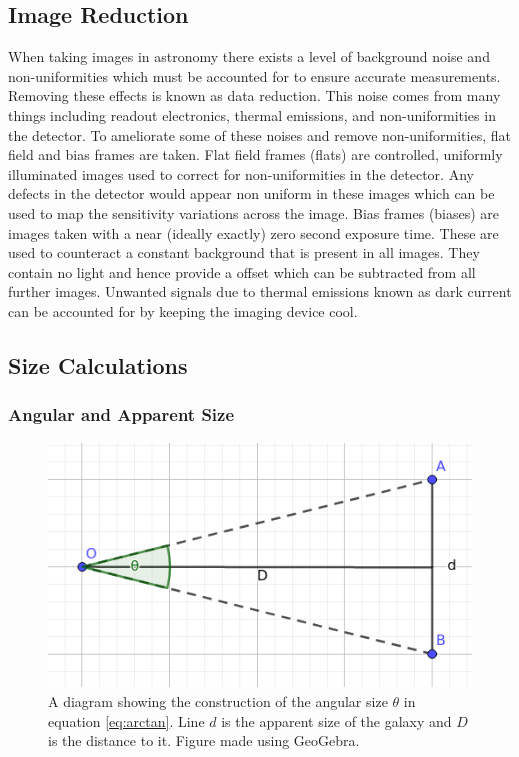 \documentclass[%
reprint,
amsmath,amssymb,
aps,
]{revtex4-2}
\begin{document}
		\subsection{Image Reduction}
			When taking images in astronomy there exists a level of background noise and non-uniformities which must be accounted for to ensure accurate measurements. Removing these effects is known as data reduction\cite{manual}. This noise comes from many things including readout electronics, thermal emissions, and non-uniformities in the detector\cite{astropy}. To ameliorate some of these noises and remove non-uniformities, flat field and bias frames are taken. Flat field frames (flats) are controlled, uniformly illuminated images used to correct for non-uniformities in the detector. Any defects in the detector would appear non uniform in these images which can be used to map the sensitivity variations across the image\cite{olivier}. Bias frames (biases) are images taken with a near (ideally exactly) zero second exposure time. These are used to counteract a constant background that is present in all images. They contain no light and hence provide a offset which can be subtracted from all further images. Unwanted signals due to thermal emissions known as dark current can be accounted for by keeping the imaging device cool.
		
		\subsection{Size Calculations}
		
			\subsubsection{Angular and Apparent Size}
			
					\begin{figure}
						\includegraphics[width=0.75\columnwidth]{apparentSize.png}
						\caption{\label{fig:trig} A diagram showing the construction of the angular size $\theta$ in equation \ref{eq:arctan}. Line $d$ is the apparent size of the galaxy and $D$ is the distance to it. Figure made using GeoGebra.}
					\end{figure}
					
\end{document}
